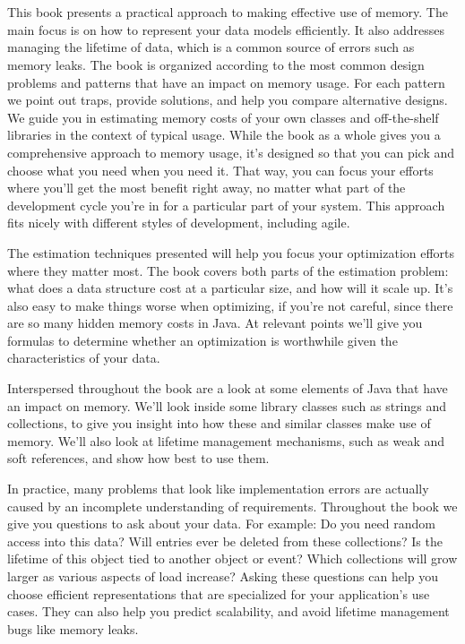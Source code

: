 \section{\thetitle}
This book presents a practical approach to making effective use of memory. 
The main focus is on how to represent your data models efficiently. It also
addresses managing the lifetime of data, which is a common source
of errors such as memory leaks. 
The book is organized according to
the most common design problems and patterns that have an impact on memory usage. For each pattern we point out
traps, provide solutions, and help you compare alternative designs.
We guide you in estimating memory costs of your own classes and
off-the-shelf libraries in the context of typical usage. 
While the book as a whole gives you a
comprehensive approach to memory usage, it's designed so that you can pick and choose what you need when you need it.
That way, you can focus your efforts where you'll get the most benefit right away, no matter what
part of the development cycle you're in for a particular part of your system.
This approach fits nicely with different styles of development, including agile.

The estimation techniques presented will help
you focus your optimization efforts where they matter most.
The book covers both parts of the estimation problem: what does a
data structure cost at a particular size, and how will it scale up. It's also easy to make things worse when
optimizing, if you're not careful, since there are so many hidden memory costs
in Java. At relevant points we'll give you formulas to
determine whether an optimization is worthwhile given the characteristics of your data.

Interspersed throughout the book are a look at some elements
of Java that have an impact on memory. We'll look inside some library
classes such as strings and collections, to give you insight into how these and
similar classes make use of memory.
We'll also look at lifetime management mechanisms, such as weak and soft references,
and show how best to use them.

In practice, many problems that look like implementation errors are actually
caused by an incomplete understanding of requirements. Throughout the book we
give you questions to ask about your data. For example: Do you need random access into this data? Will entries ever be deleted from these collections? Is the lifetime of this object tied to another object or event? Which
collections will grow larger as various aspects of load increase?  Asking these
questions can help you choose efficient representations that are specialized for your application's use cases.
They can also help you predict scalability, and avoid lifetime management bugs
like memory leaks.



